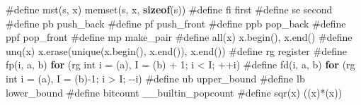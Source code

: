 \documentclass[
]{article}
\newenvironment{Shaded}{}{}
\newcommand{\AttributeTok}[1]{\textcolor[rgb]{0.49,0.56,0.16}{#1}}
\newcommand{\ControlFlowTok}[1]{\textcolor[rgb]{0.00,0.44,0.13}{\textbf{#1}}}
\newcommand{\DataTypeTok}[1]{\textcolor[rgb]{0.56,0.13,0.00}{#1}}
\newcommand{\DecValTok}[1]{\textcolor[rgb]{0.25,0.63,0.44}{#1}}
\newcommand{\FunctionTok}[1]{\textcolor[rgb]{0.02,0.16,0.49}{#1}}
\newcommand{\KeywordTok}[1]{\textcolor[rgb]{0.00,0.44,0.13}{\textbf{#1}}}
\newcommand{\NormalTok}[1]{#1}
\newcommand{\PreprocessorTok}[1]{\textcolor[rgb]{0.74,0.48,0.00}{#1}}
\begin{document}
\begin{Shaded}
\begin{Highlighting}[]
\PreprocessorTok{\#define mst}\NormalTok{(s,}\PreprocessorTok{ }\NormalTok{x)}\PreprocessorTok{ }\NormalTok{memset(s,}\PreprocessorTok{ }\NormalTok{x,}\PreprocessorTok{ }\KeywordTok{sizeof}\NormalTok{(s))}
\PreprocessorTok{\#define fi }\NormalTok{first}
\PreprocessorTok{\#define se }\NormalTok{second}
\PreprocessorTok{\#define pb }\NormalTok{push\_back}
\PreprocessorTok{\#define pf }\NormalTok{push\_front}
\PreprocessorTok{\#define ppb }\NormalTok{pop\_back}
\PreprocessorTok{\#define ppf }\NormalTok{pop\_front}
\PreprocessorTok{\#define mp }\NormalTok{make\_pair}
\PreprocessorTok{\#define all}\NormalTok{(x)}\PreprocessorTok{ }\NormalTok{x.begin(),}\PreprocessorTok{ }\NormalTok{x.end()}
\PreprocessorTok{\#define unq}\NormalTok{(x)}\PreprocessorTok{ }\NormalTok{x.erase(unique(x.begin(),}\PreprocessorTok{ }\NormalTok{x.end()),}\PreprocessorTok{ }\NormalTok{x.end())}
\PreprocessorTok{\#define rg }\AttributeTok{register}
\PreprocessorTok{\#define fp}\NormalTok{(i,}\PreprocessorTok{ }\NormalTok{a,}\PreprocessorTok{ }\NormalTok{b)}\PreprocessorTok{ }\ControlFlowTok{for}\PreprocessorTok{ }\NormalTok{(rg}\PreprocessorTok{ }\DataTypeTok{int}\PreprocessorTok{ }\NormalTok{i}\PreprocessorTok{ }\NormalTok{=}\PreprocessorTok{ }\NormalTok{(a),}\PreprocessorTok{ }\NormalTok{I}\PreprocessorTok{ }\NormalTok{=}\PreprocessorTok{ }\NormalTok{(b)}\PreprocessorTok{ }\NormalTok{+}\PreprocessorTok{ }\DecValTok{1}\NormalTok{;}\PreprocessorTok{ }\NormalTok{i}\PreprocessorTok{ }\NormalTok{\textless{}}\PreprocessorTok{ }\NormalTok{I;}\PreprocessorTok{ }\NormalTok{++i)}
\PreprocessorTok{\#define fd}\NormalTok{(i,}\PreprocessorTok{ }\NormalTok{a,}\PreprocessorTok{ }\NormalTok{b)}\PreprocessorTok{ }\ControlFlowTok{for}\PreprocessorTok{ }\NormalTok{(rg}\PreprocessorTok{ }\DataTypeTok{int}\PreprocessorTok{ }\NormalTok{i}\PreprocessorTok{ }\NormalTok{=}\PreprocessorTok{ }\NormalTok{(a),}\PreprocessorTok{ }\NormalTok{I}\PreprocessorTok{ }\NormalTok{=}\PreprocessorTok{ }\NormalTok{(b){-}}\DecValTok{1}\NormalTok{;}\PreprocessorTok{ }\NormalTok{i}\PreprocessorTok{ }\NormalTok{\textgreater{}}\PreprocessorTok{ }\NormalTok{I;}\PreprocessorTok{ }\NormalTok{{-}{-}i)}
\PreprocessorTok{\#define ub }\NormalTok{upper\_bound}
\PreprocessorTok{\#define lb }\NormalTok{lower\_bound}
\PreprocessorTok{\#define bitcount }\FunctionTok{\_\_builtin\_popcount}
\PreprocessorTok{\#define sqr}\NormalTok{(x)}\PreprocessorTok{ }\NormalTok{((x)*(x))}
  

\end{Highlighting}
\end{Shaded}
\end{document}
